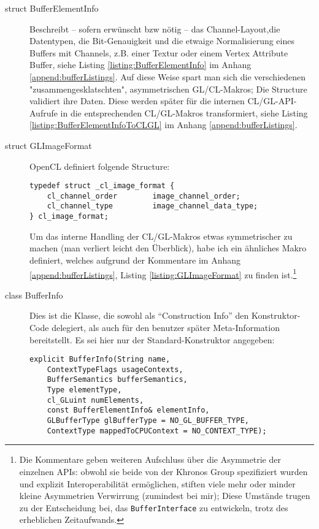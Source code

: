 \begin{description}
		\item[struct BufferElementInfo] 
		Beschreibt -- sofern erwünscht bzw nötig -- das Channel-Layout,die Datentypen, die Bit-Genauigkeit
		und die etwaige Normalisierung eines Buffers mit Channels, 
		z.B. einer Textur oder einem Vertex Attribute Buffer,
		siehe Listing \ref{listing:BufferElementInfo} im Anhang \ref{append:bufferListings}.
		Auf diese Weise spart man sich die verschiedenen "zusammengesklatschten", asymmetrischen GL/CL-Makros;
		Die Structure validiert ihre Daten. Diese werden später für die internen CL/GL-API-Aufrufe in die
		entsprechenden CL/GL-Makros transformiert,
		siehe Listing \ref{listing:BufferElementInfoToCLGL} im Anhang \ref{append:bufferListings}.
		
		\item[struct GLImageFormat]
		OpenCL definiert folgende Structure:
		
		\begin{lstlisting}		
typedef struct _cl_image_format {
    cl_channel_order        image_channel_order;
    cl_channel_type         image_channel_data_type;
} cl_image_format;	
		\end{lstlisting}
		
		Um das interne Handling der CL/GL-Makros etwas symmetrischer zu machen (man verliert leicht den Überblick),
		habe ich ein ähnliches Makro definiert, welches aufgrund der Kommentare im Anhang  \ref{append:bufferListings},
		Listing \ref{listing:GLImageFormat} zu finden ist.\footnote{Die Kommentare geben weiteren Aufschluss über 
		die Asymmetrie der einzelnen APIs: obwohl sie beide von der Khronos Group spezifiziert wurden und explizit 	
		Interoperabilität ermöglichen, stiften viele mehr oder minder kleine Asymmetrien Verwirrung (zumindest bei mir);
		Diese Umstände trugen zu der Entscheidung bei, das \lstinline|BufferInterface| zu entwickeln, trotz des
		erheblichen Zeitaufwands.}
		
		
		\item[class BufferInfo]
		Dies ist die Klasse, die sowohl als "`Construction Info"' den Konstruktor-Code delegiert, als auch für 
		den benutzer später Meta-Information bereitstellt.
		Es sei hier nur der Standard-Konstruktor angegeben:
		
		\begin{lstlisting}	
explicit BufferInfo(String name,
	ContextTypeFlags usageContexts,
	BufferSemantics bufferSemantics,
	Type elementType,
	cl_GLuint numElements,
	const BufferElementInfo& elementInfo,
	GLBufferType glBufferType = NO_GL_BUFFER_TYPE,
	ContextType mappedToCPUContext = NO_CONTEXT_TYPE);
		\end{lstlisting}
		

\end{description}
